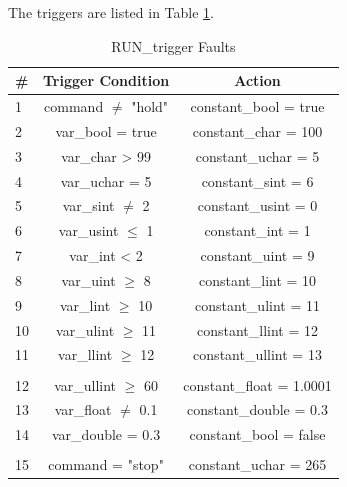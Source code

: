 \documentclass[11pt,fleqn]{report}
\begin{document}
The triggers are listed in Table \ref{tbl:triggers}.
\begin{table}[htb]
\centering
\caption{RUN\_trigger Faults} \label{tbl:triggers}
\begin{tabular}{|l|c|c|} \hline
\textbf{\#} & \textbf{Trigger Condition} & \textbf{Action} \\ \hline
1 & command $\neq$ "hold"  & constant\_bool = true \\ \hline
2 & var\_bool = true       & constant\_char = 100 \\ \hline
3 & var\_char > 99         & constant\_uchar = 5 \\ \hline
4 & var\_uchar = 5         & constant\_sint = 6 \\ \hline
5 & var\_sint $\neq$ 2     & constant\_usint = 0 \\ \hline
6 & var\_usint $\leq$ 1    & constant\_int = 1 \\ \hline
7 & var\_int < 2           & constant\_uint = 9 \\ \hline
8 & var\_uint $\geq$ 8     & constant\_lint = 10 \\ \hline
9 & var\_lint $\geq$ 10    & constant\_ulint = 11 \\ \hline
10 & var\_ulint $\geq$ 11  & constant\_llint = 12 \\ \hline
11 & var\_llint $\geq$ 12  & constant\_ullint = 13 \\ \hline
   &                       &                       \\ \hline
12 & var\_ullint $\geq$ 60 & constant\_float = 1.0001 \\ \hline
13 & var\_float $\neq$ 0.1 & constant\_double = 0.3 \\ \hline
14 & var\_double = 0.3     & constant\_bool = false \\ \hline
   &                       &                       \\ \hline
15 & command = "stop"      & constant\_uchar = 265 \\ \hline
\end{tabular}
\end{table}
\end{document}
